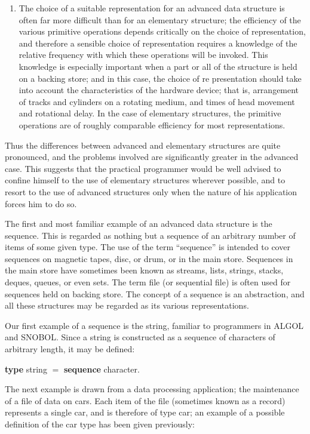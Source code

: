 \begin{enumerate}[wide, nosep, label=(\arabic*)]
	\item The choice of a suitable representation for an advanced data structure is often far more difficult than for an elementary structure; the efficiency of the various primitive operations depends critically on the choice of representation, and therefore a sensible choice of representation requires a knowledge of the relative frequency with which these operations will be invoked. This knowledge is especially important when a part or all of the structure is held on a backing store; and in this case, the choice of re presentation should take into account the characteristics of the hardware device; that is, arrangement of tracks and cylinders on a rotating medium, and times of head movement and rotational delay. In the case of elementary structures, the primitive operations are of roughly comparable efficiency for most representations.
\end{enumerate}

Thus the differences between advanced and elementary structures are quite pronounced, and the problems involved are significantly greater in the advanced case. This suggests that the practical programmer would be well advised to confine himself to the use of elementary structures wherever possible, and to resort to the use of advanced structures only when the nature of his application forces him to do so.

The first and most familiar example of an advanced data structure is the sequence. This is regarded as nothing but a sequence of an arbitrary number of items of some given type. The use of the term ``sequence'' is intended to cover sequences on magnetic tapes, disc, or drum, or in the main store. Sequences in the main store have sometimes been known as streams, lists, strings, stacks, deques, queues, or even sets. The term file (or sequential file) is often used for sequences held on backing store. The concept of a sequence is an abstraction, and all these structures may be regarded as its various representations.

Our first example of a sequence is the string, familiar to programmers in ALGOL and SNOBOL. Since a string is constructed as a sequence of characters of arbitrary length, it may be defined:

\quad \textbf{type} string $=$ \textbf{sequence} character.

The next example is drawn from a data processing application; the maintenance of a file of data on cars. Each item of the file (sometimes known as a record) represents a single car, and is therefore of type car; an example of a possible definition of the car type has been given previously:

